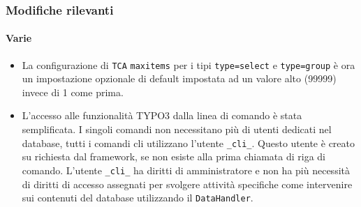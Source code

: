 \begin{frame}[fragile]
	\frametitle{Modifiche rilevanti}
	\framesubtitle{Varie}

	\begin{itemize}
		\item La configurazione di \texttt{TCA} \texttt{maxitems} per i tipi \texttt{type=select} e \texttt{type=group}
			è ora un impostazione opzionale di default impostata ad un valore alto (99999) invece di 1 come prima.

		\item L'accesso alle funzionalità TYPO3 dalla linea di comando è stata semplificata. I singoli comandi non necessitano più
			di utenti dedicati nel database, tutti i comandi cli utilizzano l'utente \texttt{\_cli\_}.
			Questo utente è creato su richiesta dal framework, se non esiste alla prima chiamata di riga di comando.
			L'utente \texttt{\_cli\_} ha diritti di amministratore e non ha più necessità di diritti di accesso assegnati per
			svolgere attività specifiche come intervenire sui contenuti del database utilizzando il \texttt{DataHandler}.

	\end{itemize}

\end{frame}

